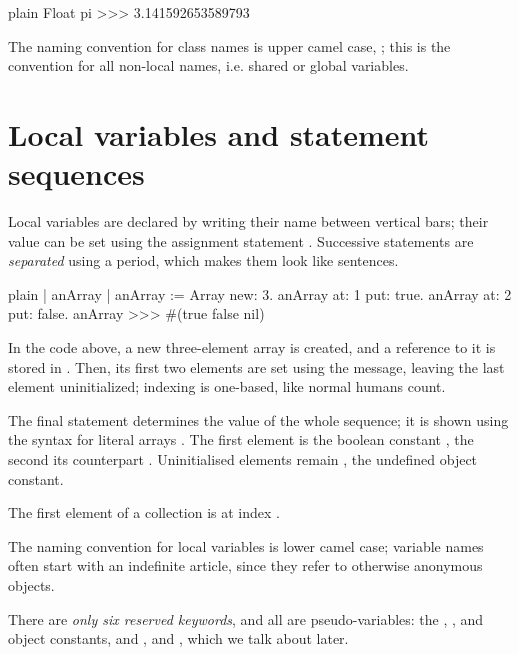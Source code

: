 \documentclass[10pt,twoside,english]{_support/latex/sbabook/sbabook}
\begin{document}
\begin{displaycode}{plain}
Float pi
>>> 3.141592653589793
\end{displaycode}

\begin{coffee}
The naming convention for class names is upper camel case, ; this is the convention for all non-local names, i.e. shared or global variables.
\end{coffee}
\section{Local variables and statement sequences}
Local variables are declared by writing their name between vertical bars; their value can be set using the assignment statement \textcode{:=}.
Successive statements are \textit{separated} using a period, which makes them look like sentences.

\begin{displaycode}{plain}
| anArray |
anArray := Array new: 3.
anArray at: 1 put: true.
anArray at: 2 put: false.
anArray
>>> #(true false nil)
\end{displaycode}

In the code above, a new three-element array is created, and a reference to it is stored in .
Then, its first two elements are set using the  message, leaving the last element uninitialized; indexing is one-based, like normal humans count.

The final statement determines the value of the whole sequence; it is shown using the syntax for literal arrays .
The first element is the boolean constant , the second its counterpart .
Uninitialised elements remain , the undefined object constant.

\begin{coffee}
The first element of a collection is at index .
\end{coffee}

\begin{coffee}
The naming convention for local variables is lower camel case; variable names often start with an indefinite article, since they refer to otherwise anonymous objects.
\end{coffee}

\begin{coffee}
There are \textit{only six reserved keywords}, and all are pseudo-variables: the , , and  object constants, and ,  and , which we talk about later.
\end{coffee}
\end{document}
